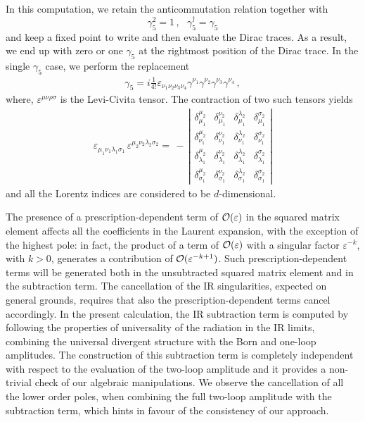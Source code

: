 \documentclass[11pt,a4paper]{article}
\begin{document}
In this computation, we retain the anticommutation relation together with
\begin{equation}
 \gamma_5^2 = 1 \,,  ~~~ \gamma_5^{\dag} = \gamma_5
\end{equation}
and keep a fixed point to write and then evaluate the Dirac traces.
As a result, we end up with zero or one $\gamma_5$ at the rightmost position of the Dirac trace.
In the single $\gamma_5$ case, we perform the replacement
%
\begin{align}
  \gamma_5 = i \frac{1}{4!} \varepsilon_{\nu_1 \nu_2 \nu_3 \nu_4}
  \gamma^{\nu_1}  \gamma^{\nu_2} \gamma^{\nu_3} \gamma^{\nu_4} \,,
\end{align}
%
where, $\varepsilon^{\mu\nu\rho\sigma}$ is the Levi-Civita tensor.
The contraction of two such tensors yields
%
\begin{align}
  \label{eqn:LeviContract}
  \varepsilon_{\mu_1\nu_1\lambda_1\sigma_1}\,\varepsilon^{\mu_2\nu_2\lambda_2\sigma_2}=\,-\,
  {\left |
  \begin{array}{cccc}
    \delta_{\mu_1}^{\mu_2} &\delta_{\mu_1}^{\nu_2}&\delta_{\mu_1}^{\lambda_2} & \delta_{\mu_1}^{\sigma_2}\\
    \delta_{\nu_1}^{\mu_2}&\delta_{\nu_1}^{\nu_2}&\delta_{\nu_1}^{\lambda_2}&\delta_{\nu_1}^{\sigma_2}\\
    \delta_{\lambda_1}^{\mu_2}&\delta_{\lambda_1}^{\nu_2}&\delta_{\lambda_1}^{\lambda_2}&\delta_{\lambda_1}^{\sigma_2}\\
    \delta_{\sigma_1}^{\mu_2}&\delta_{\sigma_1}^{\nu_2}&\delta_{\sigma_1}^{\lambda_2}&\delta_{\sigma_1}^{\sigma_2}
  \end{array}
                                                                                       \right |}
\end{align}
%
and all the Lorentz indices are considered to be $d$-dimensional.



The presence of a prescription-dependent term of ${\cal O}(\varepsilon)$ in the squared matrix element
affects all the coefficients in the Laurent expansion, with the exception of the highest pole:
in fact,
the product of a term of ${\cal O}(\varepsilon)$ with a singular factor $\varepsilon^{-k}$, with $k>0$,
generates a contribution of ${\cal O}(\varepsilon^{-k+1})$.
Such prescription-dependent terms will be generated both in the unsubtracted squared matrix element and in the subtraction term.
The cancellation of the IR singularities,
expected on general grounds,
requires that also the prescription-dependent terms cancel accordingly.
In the present calculation, the IR subtraction term is computed by following the properties of universality of the radiation in the IR limits,
combining the universal divergent structure with the Born and one-loop amplitudes.
The construction of this subtraction term is completely independent with respect to the evaluation of the two-loop amplitude and it
provides a non-trivial check of our algebraic manipulations.
We observe the cancellation of all the lower order poles, when combining the full two-loop amplitude with the subtraction term, which hints in favour of the consistency of our approach.
\end{document}
